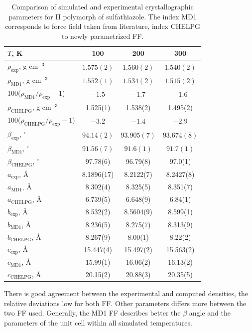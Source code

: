     \begin{table}[htb]   
    \caption{Comparison of simulated and experimental \cite{drebushchak_crystal_2008} crystallographic parameters for II polymorph of sulfathiazole. The index MD1 corresponds to force field taken from literature, index CHELPG to newly parametrized FF.}    
	\centering
	\begin{tabular}{lccc}
		\toprule
		$T$, K & 100 & 200 & 300\\
		\midrule
		$\rho_\mathrm{exp}$, g cm$^{-3}$  & $1.575(2)$ & $1.560(2)$ & $1.540(2)$\\
		$\rho_\mathrm{MD1}$, g cm$^{-3}$ & $1.552(1)$ & $1.534(2)$ & $1.515(2)$\\
		100($\rho_\mathrm{MD1}/\rho_\mathrm{exp}-1$) & $-1.5$ & $-1.7$ & $-1.6$\\
		$\rho_\mathrm{CHELPG}$, g cm$^{-3}$ & 1.525(1) & 1.538(2) & 1.495(2)  \\
		100($\rho_\mathrm{CHELPG}/\rho_\mathrm{exp}-1$) & $-3.2$ & $-1.4$ & $-2.9$\\
		\midrule
		$\beta_\mathrm{exp}$, $^{\circ}$ & $94.14(2)$ & $93.905(7)$ & $93.674(8)$\\
		$\beta_\mathrm{MD1}$, $^{\circ}$ & $91.56(7)$ & $91.6(1)$ & $91.7(1)$\\
		$\beta_\mathrm{CHELPG}$, $^{\circ}$ & 97.78(6) & 96.79(8) & 97.0(1)\\
		\midrule
		$a_\mathrm{exp}$, \AA & 8.1896(17) & 8.2122(7) & 8.2427(8)\\
		$a_\mathrm{MD1}$, \AA & 8.302(4) & 8.325(5) & 8.351(7) \\
		$a_\mathrm{CHELPG}$, \AA & 6.739(5) & 6.648(9) & 6.84(1) \\
		\midrule
		$b_\mathrm{exp}$, \AA & 8.532(2) & 8.5604(9) & 8.599(1) \\
		$b_\mathrm{MD1}$, \AA & 8.236(5) & 8.275(7) & 8.313(9) \\
		$b_\mathrm{CHELPG}$, \AA & 8.267(9) & 8.00(1) &	8.22(2) \\
		\midrule
		$c_\mathrm{exp}$, \AA  & 15.447(4) & 15.497(2) & 15.563(2) \\
		$c_\mathrm{MD1}$, \AA & 15.99(1) & 16.06(2) & 16.13(2) \\
		$c_\mathrm{CHELPG}$, \AA & 20.15(2) & 20.88(3) & 20.35(5)\\
		\bottomrule
	\end{tabular}
	\label{tab:sulfathiazol}
\end{table}

There is good agreement between the experimental and computed densities, the relative deviations low for both FF. Other parameters differs more between the two FF used. Generally, the MD1 FF describes better the $\beta$ angle and the parameters of the unit cell within all simulated temperatures.

